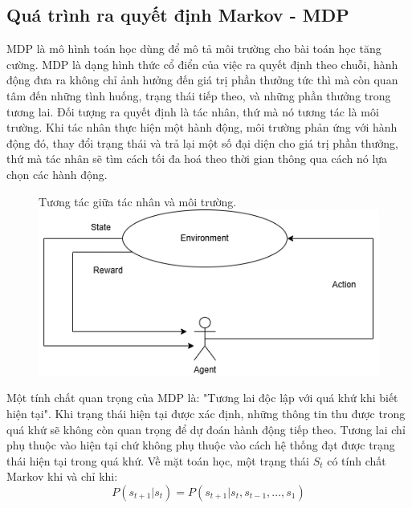 \documentclass{uetgraduation}
\begin{document}
\subsection{Quá trình ra quyết định Markov - MDP}
MDP là mô hình toán học dùng để mô tả môi trường cho bài toán học tăng cường. MDP là dạng hình thức cổ điển của việc ra quyết định theo chuỗi, hành động đưa ra không chỉ ảnh hưởng đến giá trị phần thưởng
tức thì mà còn quan tâm đến những tình huống, trạng thái tiếp theo, và những phần thưởng trong tương lai. Đối tượng ra quyết định là tác nhân, thứ mà nó tương tác là môi trường. Khi tác nhân thực hiện một
hành động, môi trường phản ứng với hành động đó, thay đổi trạng thái và trả lại một số đại diện cho giá trị phần thưởng, thứ mà tác nhân sẽ tìm cách tối đa hoá theo thời gian thông qua cách nó lựa chọn các
hành động.
\begin{figure}{Tương tác giữa tác nhân và môi trường.}
    \centering
    \includegraphics[scale=0.7]{mdp}
    \label{fig:mdp}
\end{figure}

Một tính chất quan trọng của MDP là: "Tương lai độc lập với quá khứ khi biết hiện tại". Khi trạng thái hiện tại được xác định, những thông tin thu được trong quá khứ sẽ không còn quan trọng để
dự đoán hành động tiếp theo. Tương lai chỉ phụ thuộc vào hiện tại chứ không phụ thuộc vào cách hệ thống đạt được trạng thái hiện tại trong quá khứ.
Về mặt toán học, một trạng thái $S_t$ có tính chất Markov khi và chỉ khi:
\begin{equation}
    P(s_{t+1} | s_t) = P(s_{t+1} | s_t, s_{t-1},\dots, s_1)
    \label{eq:markov_property}
\end{equation}
\end{document}
